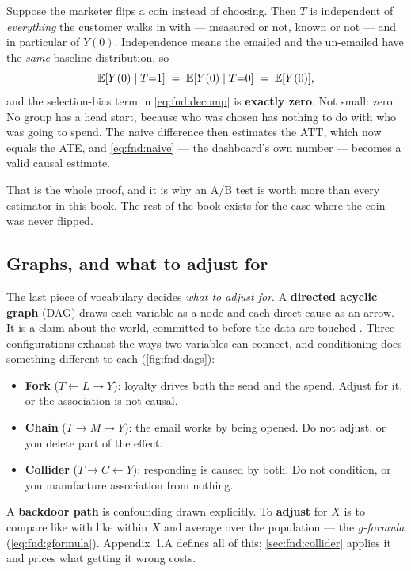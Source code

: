 Suppose the marketer flips a coin instead of choosing. Then $T$ is independent of
\emph{everything} the customer walks in with --- measured or not, known or not --- and in
particular of $Y(0)$. Independence means the emailed and the un-emailed have the \emph{same}
baseline distribution, so
%
\[
  \operatorname{\mathbb{E}}[Y(0) \mid T{=}1] \;=\; \operatorname{\mathbb{E}}[Y(0) \mid T{=}0] \;=\; \operatorname{\mathbb{E}}[Y(0)],
\]
%
and the selection-bias term in \cref{eq:fnd:decomp} is \textbf{exactly zero}. Not small: zero.
No group has a head start, because who was chosen has nothing to do with who was going to
spend. The naive difference then estimates the ATT, which now equals the ATE, and
\cref{eq:fnd:naive} --- the dashboard's own number --- becomes a valid causal estimate.

That is the whole proof, and it is why an A/B test is worth more than every estimator in this
book. The rest of the book exists for the case where the coin was never flipped.

\subsection*{Graphs, and what to adjust for}

The last piece of vocabulary decides \emph{what to adjust for}. A \textbf{directed acyclic
graph} (DAG) draws each variable as a node and each direct cause as an arrow. It is a claim about
the world, committed to before the data are touched \citep{greenland1999}. Three configurations
exhaust the ways two variables can connect, and conditioning does something different to each
(\cref{fig:fnd:dags}):

\begin{itemize}[leftmargin=*, itemsep=.2em]
  \item \textbf{Fork} ($T \leftarrow L \rightarrow Y$): loyalty drives both the send and the
        spend. Adjust for it, or the association is not causal.
  \item \textbf{Chain} ($T \rightarrow M \rightarrow Y$): the email works by being opened. Do not
        adjust, or you delete part of the effect.
  \item \textbf{Collider} ($T \rightarrow C \leftarrow Y$): responding is caused by both. Do not
        condition, or you manufacture association from nothing.
\end{itemize}



A \textbf{backdoor path} is confounding drawn explicitly. To \textbf{adjust} for $X$ is to
compare like with like within $X$ and average over the population --- the \emph{g-formula}
(\cref{eq:fnd:gformula}). Appendix~1.A defines all of this; \cref{sec:fnd:collider} applies it
and prices what getting it wrong costs.

